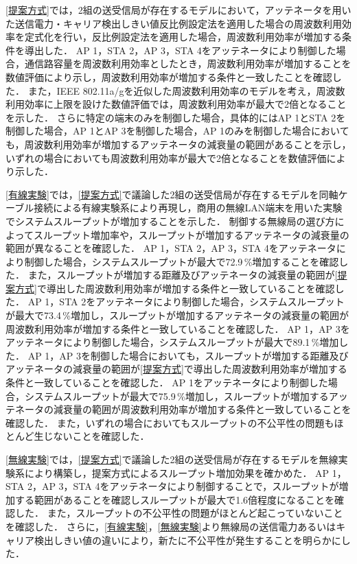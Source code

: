 \documentclass[master]{kuisthesis}		%
\begin{document}
\ref{提案方式}では，2組の送受信局が存在するモデルにおいて，アッテネータを用いた送信電力・キャリア検出しきい値反比例設定法を適用した場合の周波数利用効率を定式化を行い，反比例設定法を適用した場合，周波数利用効率が増加する条件を導出した．
AP 1，STA 2，AP 3，STA 4をアッテネータにより制御した場合，通信路容量を周波数利用効率としたとき，周波数利用効率が増加することを数値評価により示し，周波数利用効率が増加する条件と一致したことを確認した．
また，IEEE 802.11a/gを近似した周波数利用効率のモデルを考え，周波数利用効率に上限を設けた数値評価では，周波数利用効率が最大で2倍となることを示した．
さらに特定の端末のみを制御した場合，具体的にはAP 1とSTA 2を制御した場合，AP 1とAP 3を制御した場合，AP 1のみを制御した場合においても，周波数利用効率が増加するアッテネータの減衰量の範囲があることを示し，いずれの場合においても周波数利用効率が最大で2倍となることを数値評価により示した．

\ref{有線実験}では，\ref{提案方式}で議論した2組の送受信局が存在するモデルを同軸ケーブル接続による有線実験系により再現し，商用の無線LAN端末を用いた実験でシステムスループットが増加することを示した．
制御する無線局の選び方によってスループット増加率や，スループットが増加するアッテネータの減衰量の範囲が異なることを確認した．
AP 1，STA 2，AP 3，STA 4をアッテネータにより制御した場合，システムスループットが最大で72.9\,\%増加することを確認した．
また，スループットが増加する距離及びアッテネータの減衰量の範囲が\ref{提案方式}で導出した周波数利用効率が増加する条件と一致していることを確認した．
AP 1，STA 2をアッテネータにより制御した場合，システムスループットが最大で73.4\,\%増加し，スループットが増加するアッテネータの減衰量の範囲が周波数利用効率が増加する条件と一致していることを確認した．
AP 1，AP 3をアッテネータにより制御した場合，システムスループットが最大で89.1\,\%増加した．
AP 1，AP 3を制御した場合においても，スループットが増加する距離及びアッテネータの減衰量の範囲が\ref{提案方式}で導出した周波数利用効率が増加する条件と一致していることを確認した．
AP 1をアッテネータにより制御した場合，システムスループットが最大で75.9\,\%増加し，スループットが増加するアッテネータの減衰量の範囲が周波数利用効率が増加する条件と一致していることを確認した．
また，いずれの場合においてもスループットの不公平性の問題もほとんど生じないことを確認した．

\ref{無線実験}では，\ref{提案方式}で議論した2組の送受信局が存在するモデルを無線実験系により構築し，提案方式によるスループット増加効果を確かめた．
AP 1，STA 2，AP 3，STA 4をアッテネータにより制御することで，スループットが増加する範囲があることを確認しスループットが最大で1.6倍程度になることを確認した．
また，スループットの不公平性の問題がほとんど起こっていないことを確認した．
さらに，\ref{有線実験}，\ref{無線実験}より無線局の送信電力あるいはキャリア検出しきい値の違いにより，新たに不公平性が発生することを明らかにした．
\end{document}
